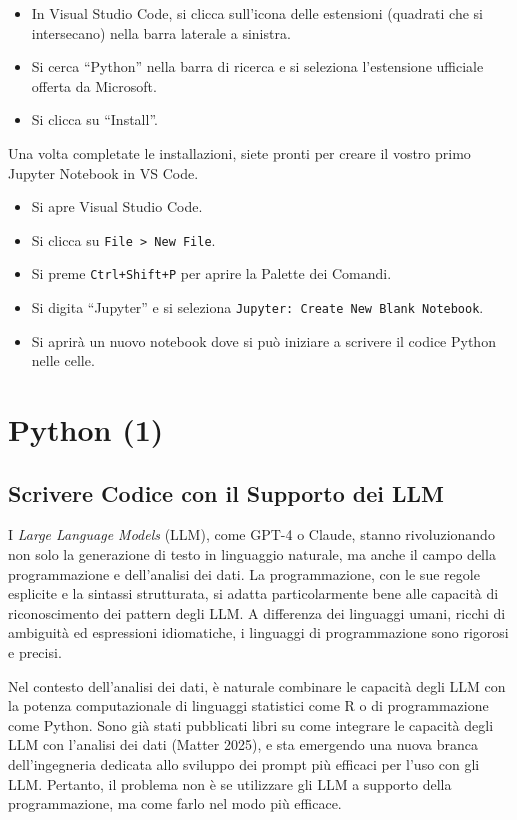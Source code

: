 \documentclass[
  letterpaper,
  krantz2]{{[}./krantz{]}}
\providecommand{\tightlist}{%
  \setlength{\itemsep}{0pt}\setlength{\parskip}{0pt}}\usepackage{longtable,booktabs,array}
\begin{document}
\begin{itemize}
\tightlist
\item
  In Visual Studio Code, si clicca sull'icona delle estensioni (quadrati
  che si intersecano) nella barra laterale a sinistra.
\item
  Si cerca ``Python'' nella barra di ricerca e si seleziona l'estensione
  ufficiale offerta da Microsoft.
\item
  Si clicca su ``Install''.
\end{itemize}

Una volta completate le installazioni, siete pronti per creare il vostro
primo Jupyter Notebook in VS Code.

\begin{itemize}
\tightlist
\item
  Si apre Visual Studio Code.
\item
  Si clicca su \texttt{File\ \textgreater{}\ New\ File}.
\item
  Si preme \texttt{Ctrl+Shift+P} per aprire la Palette dei Comandi.
\item
  Si digita ``Jupyter'' e si seleziona
  \texttt{Jupyter:\ Create\ New\ Blank\ Notebook}.
\item
  Si aprirà un nuovo notebook dove si può iniziare a scrivere il codice
  Python nelle celle.
\end{itemize}

\chapter{Python (1)}\label{sec-python-1}

\section{Scrivere Codice con il Supporto dei
LLM}\label{scrivere-codice-con-il-supporto-dei-llm}

I \emph{Large Language Models} (LLM), come GPT-4 o Claude, stanno
rivoluzionando non solo la generazione di testo in linguaggio naturale,
ma anche il campo della programmazione e dell'analisi dei dati. La
programmazione, con le sue regole esplicite e la sintassi strutturata,
si adatta particolarmente bene alle capacità di riconoscimento dei
pattern degli LLM. A differenza dei linguaggi umani, ricchi di ambiguità
ed espressioni idiomatiche, i linguaggi di programmazione sono rigorosi
e precisi.

Nel contesto dell'analisi dei dati, è naturale combinare le capacità
degli LLM con la potenza computazionale di linguaggi statistici come R o
di programmazione come Python. Sono già stati pubblicati libri su come
integrare le capacità degli LLM con l'analisi dei dati (Matter 2025), e
sta emergendo una nuova branca dell'ingegneria dedicata allo sviluppo
dei prompt più efficaci per l'uso con gli LLM. Pertanto, il problema non
è se utilizzare gli LLM a supporto della programmazione, ma come farlo
nel modo più efficace.
\end{document}
